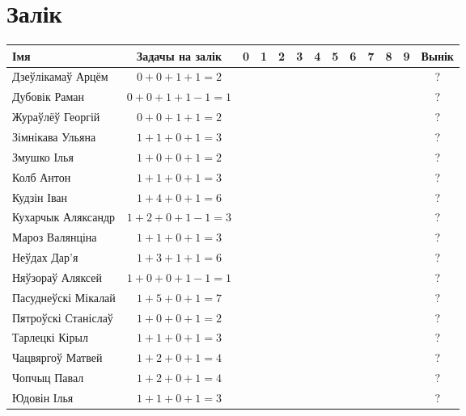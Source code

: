 \documentclass[12pt, a4paper]{extarticle}
\begin{document}
    \section{Залік}
    \begin{table}[H]
        \begin{minipage}{\textwidth}
            \begin{tabular}{|l|c|c|c|c|c|c|c|c|c|c|c|c|}
                \hline
                Імя                 &   Задачы на залік  & 0 & 1 & 2 & 3 & 4 & 5 & 6 & 7 & 8 & 9 &   Вынік  \\ \hline
                Дзеўлікамаў Арцём   &   $0+0+1+1=2$  & &&&&&&&&&& ? \\ \hline
                Дубовік Раман       &   $0+0+1+1-1=1$ & &&&&&&&&&&  ? \\ \hline
                Жураўлёў Георгій    &   $0+0+1+1=2$ & &&&&&&&&&&  ? \\ \hline
                Зімнікава Ульяна    &   $1+1+0+1=3$ & &&&&&&&&&&  ? \\ \hline
                Змушко Ілья         &   $1+0+0+1=2$ & &&&&&&&&&&  ? \\ \hline
                Колб Антон          &   $1+1+0+1=3$ & &&&&&&&&&&  ? \\ \hline
                Кудзін Іван         &   $1+4+0+1=6$ & &&&&&&&&&&  ? \\ \hline
                Кухарчык Аляксандр  &   $1+2+0+1-1=3$ & &&&&&&&&&&  ? \\ \hline
                Мароз Валянціна     &   $1+1+0+1=3$ & &&&&&&&&&&  ? \\ \hline
                Неўдах Дар'я        &   $1+3+1+1=6$ & &&&&&&&&&&  ? \\ \hline
                Няўзораў Аляксей    &   $1+0+0+1-1=1$ & &&&&&&&&&&  ? \\ \hline
                Пасуднеўскі Мікалай &   $1+5+0+1=7$  & &&&&&&&&&&  ? \\ \hline
                Пятроўскі Станіслаў &   $1+0+0+1=2$ & &&&&&&&&&&  ? \\ \hline
                Тарлецкі Кірыл      &   $1+1+0+1=3$ & &&&&&&&&&&  ? \\ \hline
                Чацвяргоў Матвей    &   $1+2+0+1=4$ & &&&&&&&&&&  ? \\ \hline
                Чопчыц Павал        &   $1+2+0+1=4$ & &&&&&&&&&&  ? \\ \hline
                Юдовін Ілья         &   $1+1+0+1=3$ & &&&&&&&&&&  ? \\ \hline
                \end{tabular}
        \end{minipage}
    \end{table}
\end{document}
